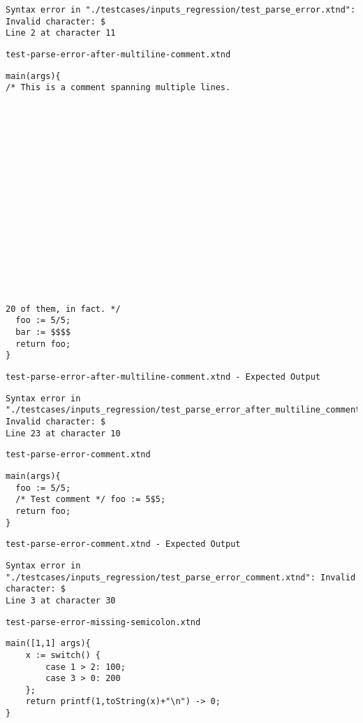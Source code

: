 \begin{lstlisting}
Syntax error in "./testcases/inputs_regression/test_parse_error.xtnd": Invalid character: $
Line 2 at character 11
\end{lstlisting}


\medskip \noindent \texttt{test-parse-error-after-multiline-comment.xtnd}


\begin{lstlisting}
main(args){
/* This is a comment spanning multiple lines.


















20 of them, in fact. */
  foo := 5/5;
  bar := $$$$
  return foo;
}
\end{lstlisting}


\medskip \noindent \texttt{test-parse-error-after-multiline-comment.xtnd - Expected Output}


\begin{lstlisting}
Syntax error in "./testcases/inputs_regression/test_parse_error_after_multiline_comment.xtnd": Invalid character: $
Line 23 at character 10
\end{lstlisting}


\medskip \noindent \texttt{test-parse-error-comment.xtnd}


\begin{lstlisting}
main(args){
  foo := 5/5;
  /* Test comment */ foo := 5$5;
  return foo;
}
\end{lstlisting}


\medskip \noindent \texttt{test-parse-error-comment.xtnd - Expected Output}


\begin{lstlisting}
Syntax error in "./testcases/inputs_regression/test_parse_error_comment.xtnd": Invalid character: $
Line 3 at character 30
\end{lstlisting}


\medskip \noindent \texttt{test-parse-error-missing-semicolon.xtnd}


\begin{lstlisting}
main([1,1] args){
	x := switch() {
		case 1 > 2: 100;
		case 3 > 0: 200
	};
	return printf(1,toString(x)+"\n") -> 0;
}
\end{lstlisting}


